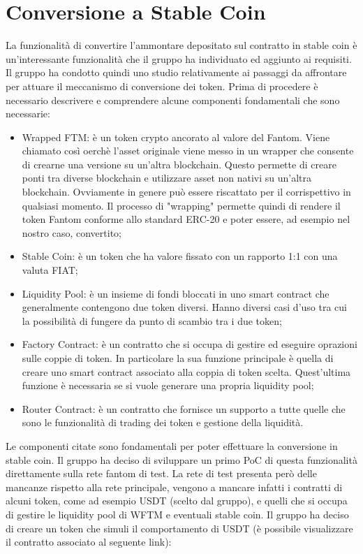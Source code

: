 \section{Conversione a Stable Coin}\label{section:conversione_stable}

La funzionalità di convertire l'ammontare depositato sul contratto in stable coin è un'interessante funzionalità che il gruppo ha individuato ed aggiunto ai requisiti.\\
Il gruppo ha condotto quindi uno studio relativamente ai passaggi da affrontare per attuare il meccanismo di conversione dei token\glo{}.
Prima di procedere è necessario descrivere e comprendere alcune componenti fondamentali che sono necessarie:

\begin{itemize}
    \item Wrapped FTM: è un token crypto ancorato al valore del Fantom. Viene chiamato così oerchè l'asset originale viene messo in un wrapper che consente di crearne una versione su un'altra blockchain. Questo permette di creare ponti tra diverse blockchain e utilizzare asset non nativi su  un'altra blockchain. Ovviamente in genere può essere riscattato per il corrispettivo in qualsiasi momento. Il processo di "wrapping" permette quindi di rendere il token Fantom conforme allo standard ERC-20 e poter essere, ad esempio nel nostro caso, convertito;
    \item Stable Coin: è un token che ha valore fissato con un rapporto 1:1 con una valuta FIAT\glo{};
    \item Liquidity Pool: è un insieme di fondi bloccati in uno smart contract che generalmente contengono due token diversi. Hanno diversi casi d'uso tra cui la possibilità di fungere da punto di scambio tra i due token;
    \item Factory Contract: è un contratto che si occupa di gestire ed eseguire oprazioni sulle coppie di token. In particolare la sua funzione principale è quella di creare uno smart contract associato alla coppia di token scelta. Quest'ultima funzione è necessaria se si vuole generare una propria liquidity pool;
    \item Router Contract: è un contratto che fornisce un supporto a tutte quelle che sono le funzionalità di trading dei token e gestione della liquidità.
\end{itemize}

Le componenti citate sono fondamentali per poter effettuare la conversione in stable coin. 
Il gruppo ha deciso di sviluppare un primo PoC di questa funzionalità direttamente sulla rete fantom di test. La rete di test presenta però delle mancanze rispetto alla rete principale, vengono a mancare infatti i contratti di alcuni token, come ad esempio USDT (scelto dal gruppo), e quelli che si occupa di gestire le liquidity pool di WFTM e eventuali stable coin.
Il gruppo ha deciso di creare un token che simuli il comportamento di USDT (è possibile visualizzare il contratto associato al seguente link):

